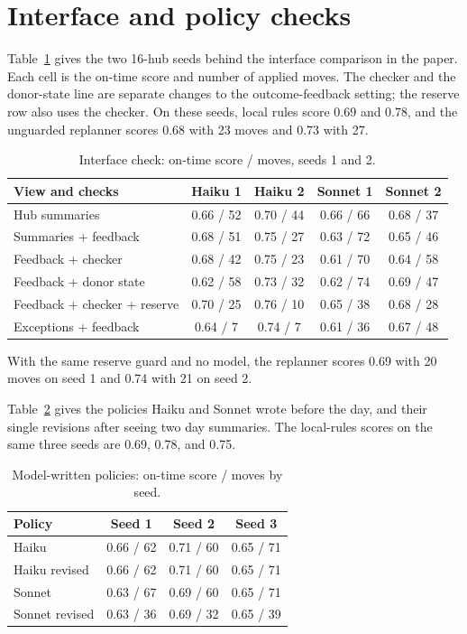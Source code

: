 \documentclass[conference]{IEEEtran}
\begin{document}
\section{Interface and policy checks}
\label{app:interface}

Table~\ref{tab:interface} gives the two 16-hub seeds behind the interface
comparison in the paper. Each cell is the on-time score and number of
applied moves. The checker and the donor-state line are separate changes
to the outcome-feedback setting; the reserve row also uses the checker.
On these seeds, local rules score 0.69 and 0.78, and the unguarded
replanner scores 0.68 with 23 moves and 0.73 with 27.

\begin{table}[h]
\caption{Interface check: on-time score / moves, seeds 1 and 2.}
\label{tab:interface}
\centering
\footnotesize
\begin{tabular}{@{}lcccc@{}}
\toprule
View and checks & Haiku 1 & Haiku 2 & Sonnet 1 & Sonnet 2 \\
\midrule
Hub summaries & 0.66 / 52 & 0.70 / 44 & 0.66 / 66 & 0.68 / 37 \\
Summaries + feedback & 0.68 / 51 & 0.75 / 27 & 0.63 / 72 & 0.65 / 46 \\
Feedback + checker & 0.68 / 42 & 0.75 / 23 & 0.61 / 70 & 0.64 / 58 \\
Feedback + donor state & 0.62 / 58 & 0.73 / 32 & 0.62 / 74 & 0.69 / 47 \\
Feedback + checker + reserve & 0.70 / 25 & 0.76 / 10 & 0.65 / 38 & 0.68 / 28 \\
Exceptions + feedback & 0.64 / 7 & 0.74 / 7 & 0.61 / 36 & 0.67 / 48 \\
\bottomrule
\end{tabular}
\end{table}

With the same reserve guard and no model, the replanner scores 0.69 with
20 moves on seed 1 and 0.74 with 21 on seed 2.

Table~\ref{tab:authored} gives the policies Haiku and Sonnet wrote before
the day, and their single revisions after seeing two day summaries. The
local-rules scores on the same three seeds are 0.69, 0.78, and 0.75.

\begin{table}[h]
\caption{Model-written policies: on-time score / moves by seed.}
\label{tab:authored}
\centering
\footnotesize
\begin{tabular}{@{}lccc@{}}
\toprule
Policy & Seed 1 & Seed 2 & Seed 3 \\
\midrule
Haiku & 0.66 / 62 & 0.71 / 60 & 0.65 / 71 \\
Haiku revised & 0.66 / 62 & 0.71 / 60 & 0.65 / 71 \\
Sonnet & 0.63 / 67 & 0.69 / 60 & 0.65 / 71 \\
Sonnet revised & 0.63 / 36 & 0.69 / 32 & 0.65 / 39 \\
\bottomrule
\end{tabular}
\end{table}
\end{document}
